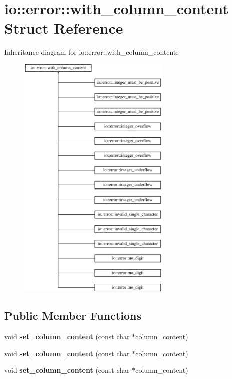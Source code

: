 \hypertarget{structio_1_1error_1_1with__column__content}{}\section{io\+:\+:error\+:\+:with\+\_\+column\+\_\+content Struct Reference}
\label{structio_1_1error_1_1with__column__content}
Inheritance diagram for io\+:\+:error\+:\+:with\+\_\+column\+\_\+content\+:\begin{figure}[H]
\begin{center}
\leavevmode
\includegraphics[height=12.000000cm]{db/dbd/structio_1_1error_1_1with__column__content}
\end{center}
\end{figure}
\subsection*{Public Member Functions}
\begin{DoxyCompactItemize}
\item 
\mbox{\label{structio_1_1error_1_1with__column__content_ae7375310dc02425cb3cc4115b3ac8d6a}} 
void {\bfseries set\+\_\+column\+\_\+content} (const char $\ast$column\+\_\+content)
\item 
\mbox{\label{structio_1_1error_1_1with__column__content_ae7375310dc02425cb3cc4115b3ac8d6a}} 
void {\bfseries set\+\_\+column\+\_\+content} (const char $\ast$column\+\_\+content)
\item 
\mbox{\label{structio_1_1error_1_1with__column__content_ae7375310dc02425cb3cc4115b3ac8d6a}} 
void {\bfseries set\+\_\+column\+\_\+content} (const char $\ast$column\+\_\+content)
\end{DoxyCompactItemize}
